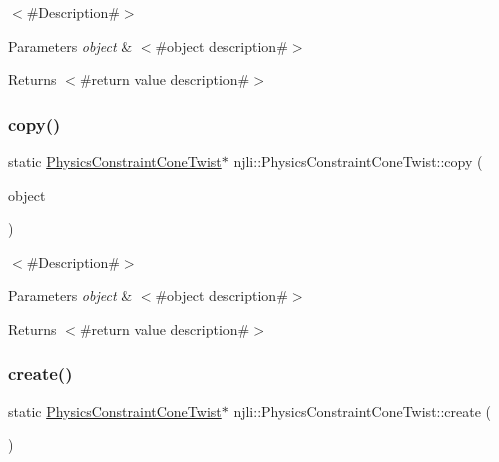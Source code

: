 $<$\#\+Description\#$>$


\begin{DoxyParams}{Parameters}
{\em object} & $<$\#object description\#$>$\\
\hline
\end{DoxyParams}
\begin{DoxyReturn}{Returns}
$<$\#return value description\#$>$ 
\end{DoxyReturn}
\mbox{\label{classnjli_1_1_physics_constraint_cone_twist_afeb1730a2b010167a283cb04f94a154a}} 
\subsubsection{\texorpdfstring{copy()}{copy()}}
{\footnotesize\ttfamily static \mbox{\hyperlink{classnjli_1_1_physics_constraint_cone_twist}{Physics\+Constraint\+Cone\+Twist}}$\ast$ njli\+::\+Physics\+Constraint\+Cone\+Twist\+::copy (\begin{DoxyParamCaption}\item[{const \mbox{\hyperlink{classnjli_1_1_physics_constraint_cone_twist}{Physics\+Constraint\+Cone\+Twist}} \&}]{object }\end{DoxyParamCaption})\hspace{0.3cm}{\ttfamily [static]}}

$<$\#\+Description\#$>$


\begin{DoxyParams}{Parameters}
{\em object} & $<$\#object description\#$>$\\
\hline
\end{DoxyParams}
\begin{DoxyReturn}{Returns}
$<$\#return value description\#$>$ 
\end{DoxyReturn}
\mbox{\label{classnjli_1_1_physics_constraint_cone_twist_a038c356380d19df8c4cf8830298e4092}} 
\subsubsection{\texorpdfstring{create()}{create()}\hspace{0.1cm}{\footnotesize\ttfamily [1/2]}}
{\footnotesize\ttfamily static \mbox{\hyperlink{classnjli_1_1_physics_constraint_cone_twist}{Physics\+Constraint\+Cone\+Twist}}$\ast$ njli\+::\+Physics\+Constraint\+Cone\+Twist\+::create (\begin{DoxyParamCaption}{ }\end{DoxyParamCaption})\hspace{0.3cm}{\ttfamily [static]}}


